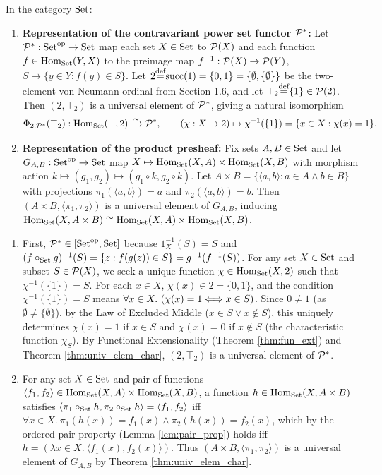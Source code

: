 \documentclass[10pt,a4paper]{article}
\begin{document}
\begin{theorem}\label{thm:set_reps}
In the category ${\textrm{Set}}$:
\begin{enumerate}
\item \textbf{Representation of the contravariant power set functor ${\mathcal{P}}^*$:} Let ${\mathcal{P}}^* : {\textrm{Set}}^{\textrm{op}} \to {\textrm{Set}}$ map each set $X \in {\textrm{Set}}$ to ${\mathcal{P}}(X)$ and each function $f \in {\textrm{Hom}}_{\textrm{Set}}(Y, X)$ to the preimage map $f^{-1} : {\mathcal{P}}(X) \to {\mathcal{P}}(Y)$, $S \mapsto \{y \in Y : f(y) \in S\}$. Let $2 {\stackrel{{\textrm{def}}}{=}} {\textrm{succ}}(1) = \{0, 1\} = \{\emptyset, \{\emptyset\}\}$ be the two-element von Neumann ordinal from Section 1.6, and let $\top_2 {\stackrel{{\textrm{def}}}{=}} \{1\} \in {\mathcal{P}}(2)$. Then $(2, \top_2)$ is a universal element of ${\mathcal{P}}^*$, giving a natural isomorphism
$$\Phi_{2,{\mathcal{P}}^*}(\top_2) : {\textrm{Hom}}_{\textrm{Set}}(-, 2) \xrightarrow{\sim} {\mathcal{P}}^*, \qquad (\chi : X \to 2) \mapsto \chi^{-1}(\{1\}) = \{x \in X : \chi(x) = 1\}.$$
\item \textbf{Representation of the product presheaf:} Fix sets $A, B \in {\textrm{Set}}$ and let $G_{A,B} : {\textrm{Set}}^{\textrm{op}} \to {\textrm{Set}}$ map $X \mapsto {\textrm{Hom}}_{\textrm{Set}}(X, A) \times {\textrm{Hom}}_{\textrm{Set}}(X, B)$ with morphism action $k \mapsto (g_1, g_2) \mapsto (g_1 \circ k, g_2 \circ k)$. Let $A \times B = \{\langle a, b \rangle : a \in A \land b \in B\}$ with projections $\pi_1(\langle a,b \rangle) = a$ and $\pi_2(\langle a,b \rangle) = b$. Then $(A \times B, \langle \pi_1, \pi_2 \rangle)$ is a universal element of $G_{A,B}$, inducing ${\textrm{Hom}}_{\textrm{Set}}(X, A \times B) \cong {\textrm{Hom}}_{\textrm{Set}}(X, A) \times {\textrm{Hom}}_{\textrm{Set}}(X, B)$.
\end{enumerate}
\end{theorem}
\myprf
\begin{enumerate}
\item First, ${\mathcal{P}}^* \in [{\textrm{Set}}^{\textrm{op}}, {\textrm{Set}}]$ because $1_X^{-1}(S) = S$ and $(f \circ_{\textrm{Set}} g)^{-1}(S) = \{z : f(g(z)) \in S\} = g^{-1}(f^{-1}(S))$. For any set $X \in {\textrm{Set}}$ and subset $S \in {\mathcal{P}}(X)$, we seek a unique function $\chi \in {\textrm{Hom}}_{\textrm{Set}}(X, 2)$ such that $\chi^{-1}(\{1\}) = S$. For each $x \in X$, $\chi(x) \in 2 = \{0, 1\}$, and the condition $\chi^{-1}(\{1\}) = S$ means $\forall x \in X.\ (\chi(x) = 1 \Longleftrightarrow x \in S)$. Since $0 \neq 1$ (as $\emptyset \neq \{\emptyset\}$), by the Law of Excluded Middle ($x \in S \lor x \notin S$), this uniquely determines $\chi(x) = 1$ if $x \in S$ and $\chi(x) = 0$ if $x \notin S$ (the characteristic function $\chi_S$). By Functional Extensionality (Theorem \ref{thm:fun_ext}) and Theorem \ref{thm:univ_elem_char}, $(2, \top_2)$ is a universal element of ${\mathcal{P}}^*$.
\item For any set $X \in {\textrm{Set}}$ and pair of functions $\langle f_1, f_2 \rangle \in {\textrm{Hom}}_{\textrm{Set}}(X, A) \times {\textrm{Hom}}_{\textrm{Set}}(X, B)$, a function $h \in {\textrm{Hom}}_{\textrm{Set}}(X, A \times B)$ satisfies $\langle \pi_1 \circ_{\textrm{Set}} h, \pi_2 \circ_{\textrm{Set}} h \rangle = \langle f_1, f_2 \rangle$ iff $\forall x \in X.\ \pi_1(h(x)) = f_1(x) \land \pi_2(h(x)) = f_2(x)$, which by the ordered-pair property (Lemma \ref{lem:pair_prop}) holds iff $h = (\lambda x \in X.\ \langle f_1(x), f_2(x) \rangle)$. Thus $(A \times B, \langle \pi_1, \pi_2 \rangle)$ is a universal element of $G_{A,B}$ by Theorem \ref{thm:univ_elem_char}.
\end{enumerate}
\myqed
\end{document}
